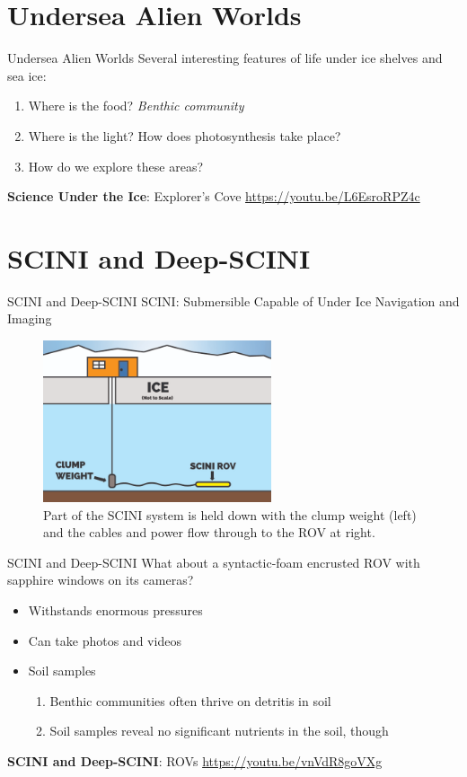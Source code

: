 \documentclass{beamer}
\begin{document}
\section{Undersea Alien Worlds}

\begin{frame}{Undersea Alien Worlds}
Several interesting features of life under ice shelves and sea ice:
\begin{enumerate}
\item Where is the food? \textit{Benthic community}
\item Where is the light?  How does photosynthesis take place?
\item How do we explore these areas?
\end{enumerate}
\textbf{Science Under the Ice}: Explorer's Cove
\url{https://youtu.be/L6EsroRPZ4c} \\ \vspace{0.5cm}
\end{frame}

\section{SCINI and Deep-SCINI}

\begin{frame}{SCINI and Deep-SCINI}
SCINI: Submersible Capable of Under Ice Navigation and Imaging
\begin{figure}
\centering
\includegraphics[width=0.6\textwidth]{scini.png}
\caption{\label{fig:scini} Part of the SCINI system is held down with the clump weight (left) and the cables and power flow through to the ROV at right.}
\end{figure}
\end{frame}

\begin{frame}{SCINI and Deep-SCINI}
What about a syntactic-foam encrusted ROV with sapphire windows on its cameras?
\begin{itemize}
\item Withstands enormous pressures
\item Can take photos and videos
\item Soil samples
\begin{enumerate}
\item Benthic communities often thrive on detritis in soil
\item Soil samples reveal no significant nutrients in the soil, though
\end{enumerate}
\end{itemize}
\textbf{SCINI and Deep-SCINI}: ROVs
\url{https://youtu.be/vnVdR8goVXg}
\end{frame}
\end{document}
